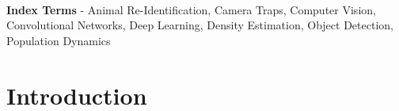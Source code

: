 \documentclass[11pt]{article}
\begin{document}
\newline
\\
\textbf{Index Terms} - Animal Re-Identification, Camera Traps, Computer Vision, Convolutional Networks, Deep Learning, Density Estimation, Object Detection, Population Dynamics
\newline
\\
\noindent

\newpage

\section*{Introduction}
\end{document}
